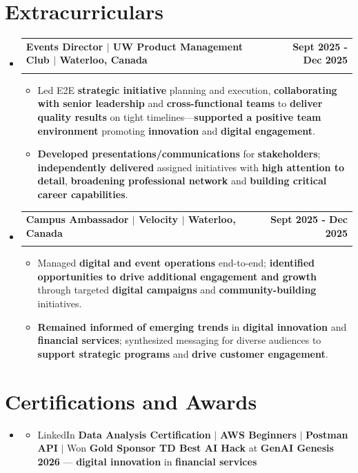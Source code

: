 \documentclass[letterpaper,10pt]{article}
\makeatletter
\newcommand{\resumeItem}[1]{
  \item\small{
    {#1 \vspace{-1pt}}
  }
}
\newcommand{\resumeSubheading}[4]{
  \vspace{-1pt}\item
    \begin{tabular*}{1.0\textwidth}[t]{l@{\extracolsep{\fill}}r}
      \textbf{#1} & \textbf{\small #2} \\
      \textit{\small#3} & \textit{\small #4} \\[-2pt]
    \end{tabular*}\vspace{-7pt}
}
\newcommand{\resumeSubHeadingListStart}{\begin{itemize}[leftmargin=0.0in, label={}]}
\newcommand{\resumeSubHeadingListEnd}{\end{itemize}}
\newcommand{\resumeItemListStart}{\begin{itemize}[leftmargin=0.15in]}
\newcommand{\resumeItemListEnd}{\end{itemize}\vspace{-4pt}}
\makeatother
\begin{document}
\section{Extracurriculars}
  \resumeSubHeadingListStart
    \resumeSubheading
      {Events Director $|$ UW Product Management Club $|$ Waterloo, Canada}{Sept 2025 - Dec 2025}
      {}{}
      \vspace{-13pt}
      \resumeItemListStart
      \vspace{-2pt}
        \resumeItem{Led E2E \textbf{strategic initiative} planning and execution, \textbf{collaborating with senior leadership} and \textbf{cross-functional teams} to \textbf{deliver quality results} on tight timelines---\textbf{supported a positive team environment} promoting \textbf{innovation} and \textbf{digital engagement}.}
        \vspace{-2pt}
        \resumeItem{\textbf{Developed presentations/communications} for \textbf{stakeholders}; \textbf{independently delivered} assigned initiatives with \textbf{high attention to detail}, \textbf{broadening professional network} and \textbf{building critical career capabilities}.}
      \resumeItemListEnd
      \vspace{-5pt}
    \resumeSubheading
      {Campus Ambassador $|$ Velocity $|$ Waterloo, Canada}{Sept 2025 - Dec 2025}
      {}{}
      \vspace{-13pt}
      \resumeItemListStart
      \vspace{-2pt}
        \resumeItem{Managed \textbf{digital and event operations} end-to-end; \textbf{identified opportunities to drive additional engagement and growth} through targeted \textbf{digital campaigns} and \textbf{community-building} initiatives.}
        \vspace{-2pt}
        \resumeItem{\textbf{Remained informed of emerging trends} in \textbf{digital innovation} and \textbf{financial services}; synthesized messaging for diverse audiences to \textbf{support strategic programs} and \textbf{drive customer engagement}.}
      \resumeItemListEnd
      \vspace{-2pt}
  \resumeSubHeadingListEnd
\vspace{-13pt}
\section{Certifications and Awards}
    \resumeSubHeadingListStart
      \item[]
          \resumeItemListStart
            \resumeItem{LinkedIn \textbf{Data Analysis Certification} $|$ \textbf{AWS Beginners} $|$ \textbf{Postman API} $|$ Won \textbf{Gold Sponsor TD Best AI Hack} at \textbf{GenAI Genesis 2026} --- \textbf{digital innovation} in \textbf{financial services}}
          \resumeItemListEnd
          \vspace{-8pt}
        
   \resumeSubHeadingListEnd
\end{document}
